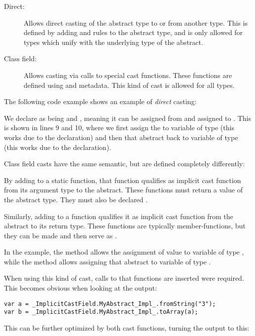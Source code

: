 \documentclass{haxe}
\begin{document}
\begin{description}
	\item[Direct:] Allows direct casting of the abstract type to or from another type. This is defined by adding  and  rules to the abstract type, and is only allowed for types which unify with the underlying type of the abstract.
	\item[Class field:] Allows casting via calls to special cast functions. These functions are defined using  and  metadata. This kind of cast is allowed for all types.
\end{description}
The following code example shows an example of \emph{direct} casting:

We declare  as being  and , meaning it can be assigned from  and assigned to . This is shown in lines 9 and 10, where we first assign the   to variable  of type  (this works due to the  declaration) and then that abstract back to variable  of type  (this works due to the  declaration).

Class field casts have the same semantic, but are defined completely differently:

By adding  to a static function, that function qualifies as implicit cast function from its argument type to the abstract. These functions must return a value of the abstract type. They must also be declared .

Similarly, adding  to a function qualifies it as implicit cast function from the abstract to its return type. These functions are typically member-functions, but they can be made  and then serve as .

In the example, the method  allows the assignment of value  to variable  of type , while the method  allows assigning that abstract to variable  of type .

When using this kind of cast, calls to that functions are inserted were required. This becomes obvious when looking at the  output:

\begin{lstlisting}
var a = _ImplicitCastField.MyAbstract_Impl_.fromString("3");
var b = _ImplicitCastField.MyAbstract_Impl_.toArray(a);
\end{lstlisting}
This can be further optimized by  both cast functions, turning the output to this:
\end{document}
